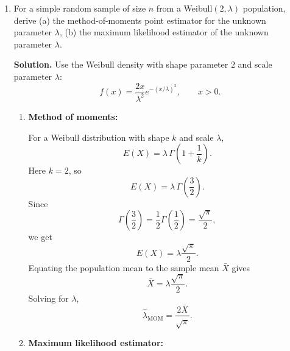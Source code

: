 \documentclass[12pt]{article}
\begin{document}
\begin{enumerate}[label=(\arabic*), leftmargin=*]
For the mean squared error,
\[
\operatorname{MSE}(T)=\operatorname{Var}(T)+[\operatorname{Bias}(T)]^2.
\]
Because $T=\frac{n-1}{n}S^2$,
\[
\operatorname{Var}(T)=\left(\frac{n-1}{n}\right)^2\operatorname{Var}(S^2).
\]
Also,
\[
[\operatorname{Bias}(T)]^2=\left(\frac{\sigma^2}{n}\right)^2=\frac{\sigma^4}{n^2}.
\]
Hence
\[
\operatorname{MSE}(T)=\left(\frac{n-1}{n}\right)^2\operatorname{Var}(S^2)+\frac{\sigma^4}{n^2}.
\]
If one uses the general formula
\[
\operatorname{Var}(S^2)=\frac{1}{n}\left(\mu_4-\frac{n-3}{n-1}\sigma^4\right),
\]
then
\[
\operatorname{MSE}(T)=\frac{(n-1)^2}{n^3}\mu_4-\frac{n-2}{n^2}\sigma^4.
\]
Finally, since
\[
T=\frac{n-1}{n}S^2,
\]
and $\frac{n-1}{n}\to 1$ as $n\to\infty$, while $S^2$ is a consistent estimator of $\sigma^2$, it follows that $T$ is also a \textbf{consistent} estimator of $\sigma^2$.

\item For a simple random sample of size $n$ from a Weibull$(2,\lambda)$ population, derive (a) the method-of-moments point estimator for the unknown parameter $\lambda$, (b) the maximum likelihood estimator of the unknown parameter $\lambda$.

\par\medskip
\noindent\textbf{Solution.}
Use the Weibull density with shape parameter $2$ and scale parameter $\lambda$:
\[
f(x)=\frac{2x}{\lambda^2}e^{-(x/\lambda)^2},\qquad x>0.
\]

\begin{enumerate}[label=(\alph*)]
    \item \textbf{Method of moments:}

    For a Weibull distribution with shape $k$ and scale $\lambda$,
    \[
    E(X)=\lambda\,\Gamma\!\left(1+\frac{1}{k}\right).
    \]
    Here $k=2$, so
    \[
    E(X)=\lambda\,\Gamma\!\left(\frac{3}{2}\right).
    \]
    Since
    \[
    \Gamma\!\left(\frac{3}{2}\right)=\frac{1}{2}\Gamma\!\left(\frac{1}{2}\right)=\frac{\sqrt\pi}{2},
    \]
    we get
    \[
    E(X)=\lambda\frac{\sqrt\pi}{2}.
    \]
    Equating the population mean to the sample mean $\bar X$ gives
    \[
    \bar X=\lambda\frac{\sqrt\pi}{2}.
    \]
    Solving for $\lambda$,
    \[
    \hat\lambda_{\mathrm{MOM}}=\frac{2\bar X}{\sqrt\pi}.
    \]

    \item \textbf{Maximum likelihood estimator:}


\end{enumerate}
\end{enumerate}
\end{document}
